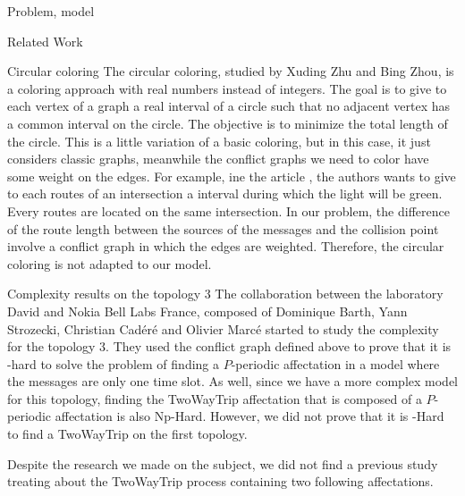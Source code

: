 \documentclass[a4paper,10pt]{report}
\begin{document}
\begin{chapter}{Problem, model}
\begin{section}{Related Work}
\begin{subsection}{Circular coloring}
 The circular coloring, studied by Xuding Zhu\cite{zhu2006recent}\cite{zhu2001circular} and Bing Zhou\cite{zhou2013multiple},
 is a coloring approach with real numbers instead of integers. The goal is to give to each vertex of a graph 
 a real interval of a circle such that no adjacent vertex has a common interval on the circle. The objective is to minimize the total length of the circle. This is a little variation of a
 basic coloring, but in this case, it just considers classic graphs, meanwhile the conflict graphs we need to color have some weight
 on the edges.
 For example, ine the article \cite{zhu2001circular}, the authors wants to give to each routes of an intersection a interval during which the light will be green. Every routes are located on the same intersection. In our problem, the difference of the route length between the sources of the messages and the collision point involve a conflict graph in which the edges are weighted.
 Therefore, the circular coloring is not adapted to our model.

\end{subsection}

\begin{subsection}{Complexity results on the topology 3}
 The collaboration between the laboratory David and Nokia Bell Labs France, composed of Dominique Barth, Yann Strozecki, Christian Cadéré and Olivier Marcé started to study the complexity for the topology 3.
 They used the conflict graph defined above to prove that it is \NP-hard to solve the problem of finding a $P$-periodic affectation in a model where the
 messages are only one time slot. As well, since we have a more complex model for this topology, finding the TwoWayTrip affectation
 that is composed of a $P$-periodic affectation is also Np-Hard. However, we did not prove that it is \NP-Hard to find
 a TwoWayTrip on the first topology.
\end{subsection}

 \end{section}

Despite the research we made on the subject, we did not find a previous study treating about the TwoWayTrip process containing two 
following affectations.
\end{chapter}
\end{document}
